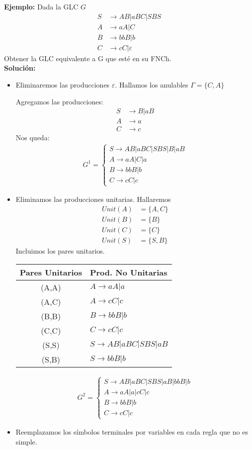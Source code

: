 \textbf{Ejemplo: }Dada la GLC $G$
\begin{align*}
S &\rightarrow AB|aBC|SBS	\\
A &\rightarrow aA|C	\\
B &\rightarrow bbB|b	\\
C &\rightarrow cC|\varepsilon
\end{align*}
Obtener la GLC equivalente a G que esté en su FNCh.\\
\textbf{Solución: }
\begin{itemize}
\item Eliminaremos las producciones $\varepsilon$. Hallamos los anulables $\Gamma =\{C,A\}$

Agregamos las producciones:
\begin{align*}
S &\rightarrow B|aB	\\
A &\rightarrow a	\\
C &\rightarrow c
\end{align*}
Nos queda: 
\begin{align*}
G^1= \left \{ \begin{array}{l}
S\rightarrow AB|aBC|SBS	|B|aB\\
A\rightarrow aA|C|a	\\
B\rightarrow bbB|b	\\
C\rightarrow cC|c\end{array} \right.
\end{align*}
\item Eliminamos las producciones unitarias.
Hallaremos
\begin{align*}
Unit(A)&=\{A,C\}	\\
Unit(B)&=\{B\}	\\
Unit(C)&=\{C\}	\\
Unit(S)&=\{S,B\}
\end{align*}
Incluimos los pares unitarios.

\begin{tabular}{cl}
Pares Unitarios & Prod. No Unitarias	\\ \hline
(A,A)	&$A\rightarrow aA|a$	\\
(A,C)	&$A\rightarrow cC|c$	\\
(B,B)	&$B\rightarrow bbB|b$	\\
(C,C)	&$C\rightarrow cC|c$	\\
(S,S)	&$S\rightarrow AB|aBC|SBS|aB$	\\
(S,B)	&$S\rightarrow bbB|b$
\end{tabular}
\begin{align*}
G^2= \left \{ \begin{array}{l}
S\rightarrow AB|aBC|SBS|aB|bbB|b	\\
A\rightarrow aA|a|cC|c	\\
B\rightarrow bbB|b	\\
C\rightarrow cC|c\end{array} \right.
\end{align*}
\item Reemplazamos los símbolos terminales por variables en cada regla que no es simple.


\end{itemize}
